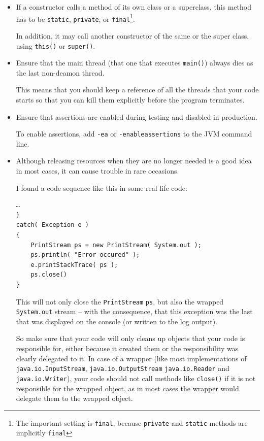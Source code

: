 \begin{itemize}
\item{If a constructor calls a method of its own class or a superclass, this method has to be \lstinline|static|, \lstinline|private|, or \lstinline|final|\footnote{The important setting is \lstinline|final|, because \lstinline|private| and \lstinline|static| methods are implicitly \lstinline|final|}.

In addition, it may call another constructor of the same or the super class, using \lstinline|this()| or \lstinline|super()|.}

\item{Ensure that the main thread (that one that executes \lstinline|main()|) always dies as the last non-deamon thread.

This means that you should keep a reference of all the threads that your code starts so that you can kill them explicitly before the program terminates.}

\item{Ensure that assertions\autocite{ORACLE_DOC_LANGUAGE_SPECIFICATION:Assert,ORACLE_DOC_ASSERTIONS} are enabled during testing and disabled in production.

To enable assertions, add \verb#-ea# or \verb#-enableassertions# to the JVM command line.}

\item{Although releasing resources when they are no longer needed is a good idea in most cases, it can cause trouble in rare occasions.

I found a code sequence like this in some real life code:
\begin{lstlisting}
…
}
catch( Exception e )
{
    PrintStream ps = new PrintStream( System.out );
    ps.println( "Error occured" );
    e.printStackTrace( ps );
    ps.close()
}
\end{lstlisting}
This will not only close the \lstinline|PrintStream| \lstinline|ps|, but also the wrapped \lstinline|System.out| stream – with the consequence, that this exception was the last that was displayed on the console (or written to the log output).

So make sure that your code will only cleans up objects that your code is responsible for, either because it created them or the responsibility was clearly delegated to it. In case of a wrapper (like most implementations of \lstinline|java.io.InputStream|, \lstinline|java.io.OutputStream| \lstinline|java.io.Reader| and \lstinline|java.io.Writer|), your code should not call methods like \lstinline|close()| if it is not responsible for the wrapped object, as in most cases the wrapper would delegate them to the wrapped object.

}
\end{itemize}
